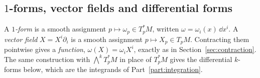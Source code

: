 \subsection{$1$-forms, vector fields and differential forms}\label{sec:oneforms}

A \emph{$1$-form} is a smooth assignment $p\mapsto\omega_p\in T^*_pM$, written $\omega=\omega_i(x)\,\dd x^i$. A \emph{vector field} $X=X^i\partial_i$ is a smooth assignment $p\mapsto X_p\in T_pM$. Contracting them pointwise gives a \emph{function},
$\omega(X)=\omega_iX^i$, exactly as in Section~\ref{sec:contraction}. The same construction with $\bigwedge^kT_p^*M$ in place of $T_p^*M$ gives the differential $k$-forms below, which are the integrands of Part~\ref{part:integration}.
